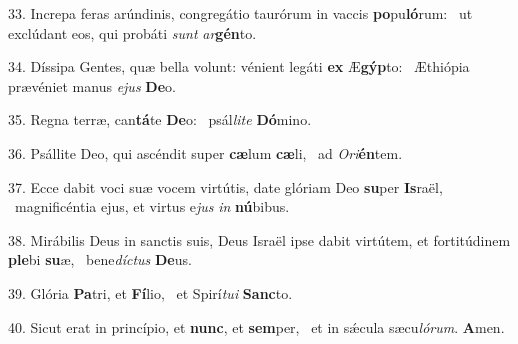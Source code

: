 33. Increpa feras arúndinis, congregátio taurórum in vaccis \textbf{po}pu\textbf{ló}rum: \ast\  ut exclúdant eos, qui probáti \textit{sunt} \textit{ar}\textbf{gén}to.\

34. Díssipa Gentes, quæ bella volunt: vénient legáti \textbf{ex} Æ\textbf{gýp}to: \ast\  Æthiópia prævéniet manus \textit{e}\textit{jus} \textbf{De}o.\

35. Regna terræ, can\textbf{tá}te \textbf{De}o: \ast\  psál\textit{li}\textit{te} \textbf{Dó}mino.\

36. Psállite Deo, qui ascéndit super \textbf{cæ}lum \textbf{cæ}li, \ast\  ad \textit{O}\textit{ri}\textbf{én}tem.\

37. Ecce dabit voci suæ vocem virtútis, date glóriam Deo \textbf{su}per \textbf{Is}raël, \ast\  magnificéntia ejus, et virtus e\textit{jus} \textit{in} \textbf{nú}bibus.\

38. Mirábilis Deus in sanctis suis, Deus Israël ipse dabit virtútem, et fortitúdinem \textbf{ple}bi \textbf{su}æ, \ast\  bene\textit{díc}\textit{tus} \textbf{De}us.\

39. Glória \textbf{Pa}tri, et \textbf{Fí}lio, \ast\  et Spirí\textit{tu}\textit{i} \textbf{Sanc}to.\

40. Sicut erat in princípio, et \textbf{nunc}, et \textbf{sem}per, \ast\  et in sǽcula sæcu\textit{ló}\textit{rum}. \textbf{A}men.\


